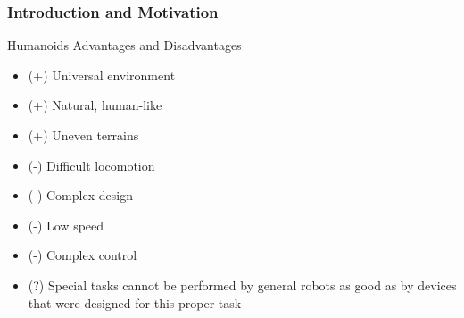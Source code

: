 \documentclass{beamer}
\begin{document}

	\begin{frame}
		\frametitle{Introduction and Motivation}
		\begin{block}{Humanoids Advantages and Disadvantages}
			\begin{itemize}
				\item(+)
					Universal environment
				\item(+)
					Natural, human-like
				\item(+)
					Uneven terrains
				\item(-)
					Difficult locomotion
				\item(-)
					Complex design
				\item(-)
					Low speed
				\item(-)
					Complex control
				\item(?) Special tasks cannot be performed by general robots as good as by devices that were designed for this proper task
			\end{itemize}
		\end{block}
	\end{frame}

\end{document}
